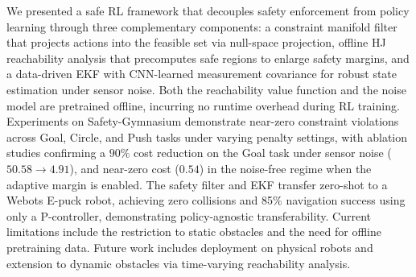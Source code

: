 \documentclass[letterpaper, 10 pt, conference]{ieeeconf}
\begin{document}
We presented a safe RL framework that decouples safety enforcement from policy learning through three complementary components: a constraint manifold filter that projects actions into the feasible set via null-space projection, offline HJ reachability analysis that precomputes safe regions to enlarge safety margins, and a data-driven EKF with CNN-learned measurement covariance for robust state estimation under sensor noise. Both the reachability value function and the noise model are pretrained offline, incurring no runtime overhead during RL training. Experiments on Safety-Gymnasium demonstrate near-zero constraint violations across Goal, Circle, and Push tasks under varying penalty settings, with ablation studies confirming a $90\%$ cost reduction on the Goal task under sensor noise ($50.58 \rightarrow 4.91$), and near-zero cost ($0.54$) in the noise-free regime when the adaptive margin is enabled. The safety filter and EKF transfer zero-shot to a Webots E-puck robot, achieving zero collisions and 85\% navigation success using only a P-controller, demonstrating policy-agnostic transferability. Current limitations include the restriction to static obstacles and the need for offline pretraining data. Future work includes deployment on physical robots and extension to dynamic obstacles via time-varying reachability analysis.


\end{document}
